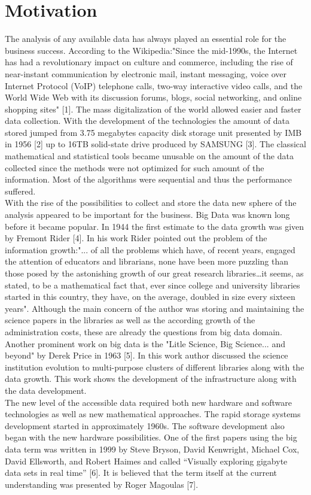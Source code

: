 \documentclass [twoside,
  11pt, a4paper,
  footinclude=true,
  headinclude=true,
  cleardoublepage=empty
]{article}
\begin{document}
\newpage
\section{Motivation}
The analysis of any available data has always played an essential role for the business success. According to the Wikipedia:"Since the mid-1990s, the Internet has had a revolutionary impact on culture and commerce, including the rise of near-instant communication by electronic mail, instant messaging, voice over Internet Protocol (VoIP) telephone calls, two-way interactive video calls, and the World Wide Web with its discussion forums, blogs, social networking, and online shopping sites" [1]. The mass digitalization of the world allowed easier and faster data collection. With the development of the technologies the amount of data stored jumped from 3.75 megabytes capacity disk storage unit presented by IMB in 1956 [2] up to 16TB solid-state drive produced by SAMSUNG [3]. The classical mathematical and statistical tools became unusable on the amount of the data collected since the methods were not optimized for such amount of the information. Most of the algorithms were sequential and thus the performance suffered.\\
With the rise of the possibilities to collect and store the data new sphere of the analysis appeared to be important for the business. Big Data was known long before it became popular. In 1944 the first estimate to the data growth was given by Fremont Rider [4]. In his work Rider pointed out the problem of the information growth:"... of all the problems which have, of recent years, engaged the attention of educators and librarians, none have been more puzzling than those posed by the astonishing growth of our great research libraries…it seems, as stated, to be a mathematical fact that, ever since college and university libraries started in this country, they have, on the average, doubled in size every sixteen years". Although the main concern of the author was storing and maintaining the science papers in the libraries as well as the according growth of the administration costs, these are already the questions from big data domain. Another prominent work on big data is the "Litle Science, Big Science... and beyond" by Derek Price in 1963 [5]. In this work author discussed the science institution evolution to multi-purpose clusters of different libraries along with the data growth. This work shows the development of the infrastructure along with the data development.\\
The new level of the accessible data required both new hardware and software technologies as well as new mathematical approaches. The rapid storage systems development started in approximately 1960s. The software development also began with the new hardware possibilities. One of the first papers using the big data term was written in 1999 by Steve Bryson, David Kenwright, Michael Cox, David Ellsworth, and Robert Haimes and called “Visually exploring gigabyte data sets in real time” [6]. It is believed that the term itself at the current understanding was presented by Roger Magoulas [7].\\
\end{document}
